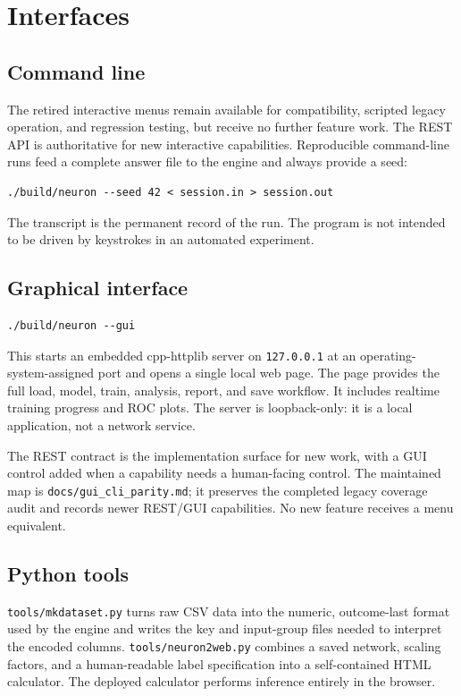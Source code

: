 \section{Interfaces}

\subsection{Command line}

The retired interactive menus remain available for compatibility, scripted
legacy operation, and regression testing, but receive no further feature work.
The REST API is authoritative for new interactive capabilities. Reproducible
command-line runs feed a
complete answer file to the engine and always provide a seed:

\begin{verbatim}
./build/neuron --seed 42 < session.in > session.out
\end{verbatim}

The transcript is the permanent record of the run.  The program is not
intended to be driven by keystrokes in an automated experiment.

\subsection{Graphical interface}

\begin{verbatim}
./build/neuron --gui
\end{verbatim}

This starts an embedded cpp-httplib server on
\texttt{127.0.0.1} at an operating-system-assigned port and opens a
single local web page.  The page provides the full load, model, train,
analysis, report, and save workflow.  It includes realtime training
progress and ROC plots.  The server is loopback-only: it is a local
application, not a network service.

The REST contract is the implementation surface for new work, with a GUI
control added when a capability needs a human-facing control. The maintained
map is \texttt{docs/gui\_cli\_parity.md}; it preserves the completed legacy
coverage audit and records newer REST/GUI capabilities. No new feature receives
a menu equivalent.

\subsection{Python tools}

\texttt{tools/mkdataset.py} turns raw CSV data into the numeric,
outcome-last format used by the engine and writes the key and
input-group files needed to interpret the encoded columns.
\texttt{tools/neuron2web.py} combines a saved network, scaling factors,
and a human-readable label specification into a self-contained HTML
calculator.  The deployed calculator performs inference entirely in
the browser.

